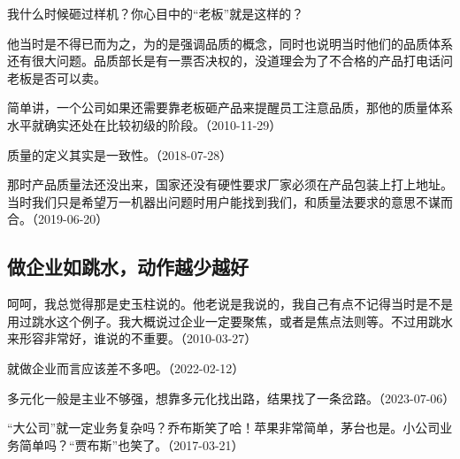 
我什么时候砸过样机？你心目中的“老板”就是这样的？


他当时是不得已而为之，为的是强调品质的概念，同时也说明当时他们的品质体系还有很大问题。品质部长是有一票否决权的，没道理会为了不合格的产品打电话问老板是否可以卖。

简单讲，一个公司如果还需要靠老板砸产品来提醒员工注意品质，那他的质量体系水平就确实还处在比较初级的阶段。（2010-11-29）

质量的定义其实是一致性。（2018-07-28）


那时产品质量法还没出来，国家还没有硬性要求厂家必须在产品包装上打上地址。当时我们只是希望万一机器出问题时用户能找到我们，和质量法要求的意思不谋而合。（2019-06-20）

\subsection{做企业如跳水，动作越少越好}


呵呵，我总觉得那是史玉柱说的。他老说是我说的，我自己有点不记得当时是不是用过跳水这个例子。我大概说过企业一定要聚焦，或者是焦点法则等。不过用跳水来形容非常好，谁说的不重要。（2010-03-27）


就做企业而言应该差不多吧。（2022-02-12）

多元化一般是主业不够强，想靠多元化找出路，结果找了一条岔路。（2023-07-06）


“大公司”就一定业务复杂吗？乔布斯笑了哈！苹果非常简单，茅台也是。小公司业务简单吗？“贾布斯”也笑了。（2017-03-21）


